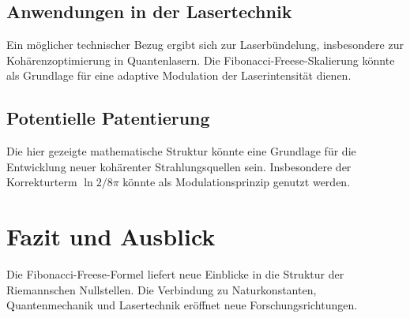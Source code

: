 \documentclass[a4paper,12pt]{article}
\begin{document}
\subsection{Anwendungen in der Lasertechnik}
Ein möglicher technischer Bezug ergibt sich zur Laserbündelung, insbesondere zur Kohärenzoptimierung in Quantenlasern. Die Fibonacci-Freese-Skalierung könnte als Grundlage für eine adaptive Modulation der Laserintensität dienen.

\subsection{Potentielle Patentierung}
Die hier gezeigte mathematische Struktur könnte eine Grundlage für die Entwicklung neuer kohärenter Strahlungsquellen sein. Insbesondere der Korrekturterm \( \ln 2 / 8\pi \) könnte als Modulationsprinzip genutzt werden.

\section{Fazit und Ausblick}
Die Fibonacci-Freese-Formel liefert neue Einblicke in die Struktur der Riemannschen Nullstellen. Die Verbindung zu Naturkonstanten, Quantenmechanik und Lasertechnik eröffnet neue Forschungsrichtungen.
\end{document}
